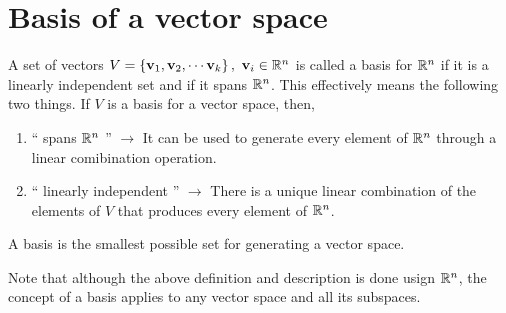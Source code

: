 \section{Basis of a vector space}
A set of vectors $V = \left\{ \mathbf{v}_1, \mathbf{v}_2,  \cdots \mathbf{v}_k \right\}, \,\, \mathbf{v}_i \in \mathbb{R}^n$ is called a basis for $\mathbb{R}^n$ if it is a linearly independent set and if it spans $\mathbb{R}^n$. This effectively means the following two things. If $V$ is a basis for a vector space, then,
\begin{enumerate}
    \item `` spans $\mathbb{R}^n$ '' $\longrightarrow$ It can be used to generate every element of $\mathbb{R}^n$ through a linear comibination operation.
    \item `` linearly independent '' $\longrightarrow$ There is a unique linear combination of the elements of $V$ that produces every element of $\mathbb{R}^n$.
\end{enumerate}
A basis is the smallest possible set for generating a vector space. 

Note that although the above definition and description is done usign $\mathbb{R}^n$, the concept of a basis applies to any vector space and all its subspaces.

